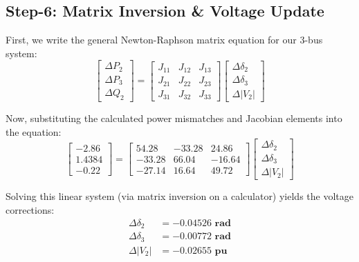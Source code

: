 \documentclass[11pt]{article}
\begin{document}
\subsection*{Step-6: Matrix Inversion \& Voltage Update}
\begin{stepbox}
First, we write the general Newton-Raphson matrix equation for our 3-bus system:
\begin{equation*}
    \begin{bmatrix} \Delta P_2 \\ \Delta P_3 \\ \Delta Q_2 \end{bmatrix} 
    = 
    \begin{bmatrix} 
    J_{11} & J_{12} & J_{13} \\ 
    J_{21} & J_{22} & J_{23} \\ 
    J_{31} & J_{32} & J_{33} 
    \end{bmatrix} 
    \begin{bmatrix} \Delta \delta_2 \\ \Delta \delta_3 \\ \Delta |V_2| \end{bmatrix}
\end{equation*}

Now, substituting the calculated power mismatches and Jacobian elements into the equation:
\begin{equation*}
    \begin{bmatrix} -2.86 \\ 1.4384 \\ -0.22 \end{bmatrix} 
    = 
    \begin{bmatrix} 
    54.28 & -33.28 & 24.86 \\ 
    -33.28 & 66.04 & -16.64 \\ 
    -27.14 & 16.64 & 49.72 
    \end{bmatrix} 
    \begin{bmatrix} \Delta \delta_2 \\ \Delta \delta_3 \\ \Delta |V_2| \end{bmatrix}
\end{equation*}

Solving this linear system (via matrix inversion on a calculator) yields the voltage corrections:
\begin{align*}
    \Delta \delta_2 &= \mathbf{-0.04526 \text{ rad}} \\
    \Delta \delta_3 &= \mathbf{-0.00772 \text{ rad}} \\
    \Delta |V_2| &= \mathbf{-0.02655 \text{ pu}}
\end{align*}


\end{stepbox}
\end{document}
